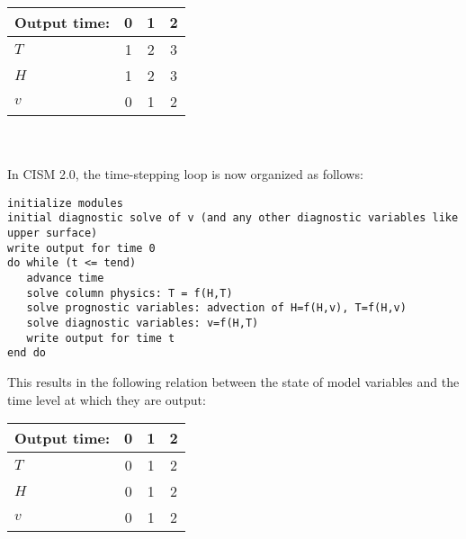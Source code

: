 \begin{tabular}{lccc}
\hline
Output time:  & 0    & 1   & 2  \\
\hline
$T$  &  1                    &  2                    &  3  \\
$H$  &  1                    &  2                    &  3  \\
$v$  &  0                    &  1                    &  2  \\
\hline
\end{tabular}
\\~\\  %

In CISM 2.0, the time-stepping loop is now organized as follows:
\begin{verbatim}
initialize modules
initial diagnostic solve of v (and any other diagnostic variables like upper surface)
write output for time 0
do while (t <= tend)
   advance time
   solve column physics: T = f(H,T) 
   solve prognostic variables: advection of H=f(H,v), T=f(H,v)
   solve diagnostic variables: v=f(H,T)
   write output for time t
end do
\end{verbatim}

\noindent
This results in the following relation between the state of model variables and
the time level at which they are output:

\begin{tabular}{lccc}
\hline
Output time:  & 0    & 1   & 2  \\
\hline
$T$  &  0                    &  1                    &  2  \\
$H$  &  0                    &  1                    &  2  \\
$v$  &  0                    &  1                    &  2  \\
\hline
\end{tabular}


